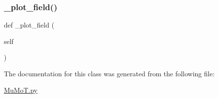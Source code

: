 \subsubsection{\texorpdfstring{\+\_\+plot\+\_\+field()}{\_plot\_field()}}
{\footnotesize\ttfamily def \+\_\+plot\+\_\+field (\begin{DoxyParamCaption}\item[{}]{self }\end{DoxyParamCaption})\hspace{0.3cm}{\ttfamily [private]}}



The documentation for this class was generated from the following file\+:\begin{DoxyCompactItemize}
\item 
\hyperlink{_mu_mo_t_8py}{Mu\+Mo\+T.\+py}\end{DoxyCompactItemize}
